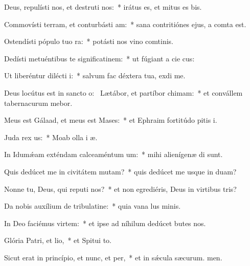 \item Deus, repulísti nos, et destruti nos:~* irátus es, et mitus es bis.
\item Commovísti terram, et conturbásti am:~* sana contritiónes ejus, a comta est.
\item Ostendísti pópulo tuo ra:~* potásti nos vino comtinis.
\item Dedísti metuéntibus te significatinem:~* ut fúgiant a cie cus:
\item Ut liberéntur dilécti i:~* salvum fac déxtera tua,  exdi me.
\item Deus locútus est in sancto o:~\pscross{} Lætábor, et partíbor chimam:~* et convállem tabernacurum mebor.
\item Meus est Gálaad, et meus est Mases:~* et Ephraim fortitúdo pitis i.
\item Juda rex us:~* Moab olla i æ.
\item In Idumǽam exténdam calceaméntum um:~* mihi alienígenæ di sunt.
\item Quis dedúcet me in civitátem mutam?~* quis dedúcet me usque in duam?
\item Nonne tu, Deus, qui reputi nos?~* et non egrediéris, Deus in virtibus tris?
\item Da nobis auxílium de tribulatine:~* quia vana lus minis.
\item In Deo faciémus virtem:~* et ipse ad níhilum dedúcet butes nos.
\item Glória Patri, et lio,~* et Spitui to.
\item Sicut erat in princípio, et nunc, et per,~* et in sǽcula sæcurum. men.
